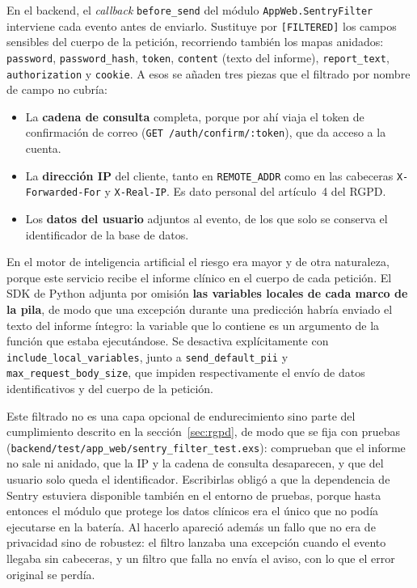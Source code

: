En el backend, el \emph{callback} \texttt{before\_send} del módulo \texttt{AppWeb.SentryFilter} interviene cada evento antes de enviarlo. Sustituye por \texttt{[FILTERED]} los campos sensibles del cuerpo de la petición, recorriendo también los mapas anidados: \texttt{password}, \texttt{password\_hash}, \texttt{token}, \texttt{content} (texto del informe), \texttt{report\_text}, \texttt{authorization} y \texttt{cookie}. A esos se añaden tres piezas que el filtrado por nombre de campo no cubría:

\begin{itemize}
 \item La \textbf{cadena de consulta} completa, porque por ahí viaja el token de confirmación de correo (\texttt{GET /auth/confirm/:token}), que da acceso a la cuenta.
 \item La \textbf{dirección IP} del cliente, tanto en \texttt{REMOTE\_ADDR} como en las cabeceras \texttt{X-Forwarded-For} y \texttt{X-Real-IP}. Es dato personal del artículo~4 del RGPD.
 \item Los \textbf{datos del usuario} adjuntos al evento, de los que solo se conserva el identificador de la base de datos.
\end{itemize}

En el motor de inteligencia artificial el riesgo era mayor y de otra naturaleza, porque este servicio recibe el informe clínico en el cuerpo de cada petición. El SDK de Python adjunta por omisión \textbf{las variables locales de cada marco de la pila}, de modo que una excepción durante una predicción habría enviado el texto del informe íntegro: la variable que lo contiene es un argumento de la función que estaba ejecutándose. Se desactiva explícitamente con \texttt{include\_local\_variables}, junto a \texttt{send\_default\_pii} y \texttt{max\_request\_body\_size}, que impiden respectivamente el envío de datos identificativos y del cuerpo de la petición.

Este filtrado no es una capa opcional de endurecimiento sino parte del cumplimiento descrito en la sección~\ref{sec:rgpd}, de modo que se fija con pruebas (\texttt{backend/test/app\_web/sentry\_filter\_test.exs}): comprueban que el informe no sale ni anidado, que la IP y la cadena de consulta desaparecen, y que del usuario solo queda el identificador. Escribirlas obligó a que la dependencia de Sentry estuviera disponible también en el entorno de pruebas, porque hasta entonces el módulo que protege los datos clínicos era el único que no podía ejecutarse en la batería. Al hacerlo apareció además un fallo que no era de privacidad sino de robustez: el filtro lanzaba una excepción cuando el evento llegaba sin cabeceras, y un filtro que falla no envía el aviso, con lo que el error original se perdía.

